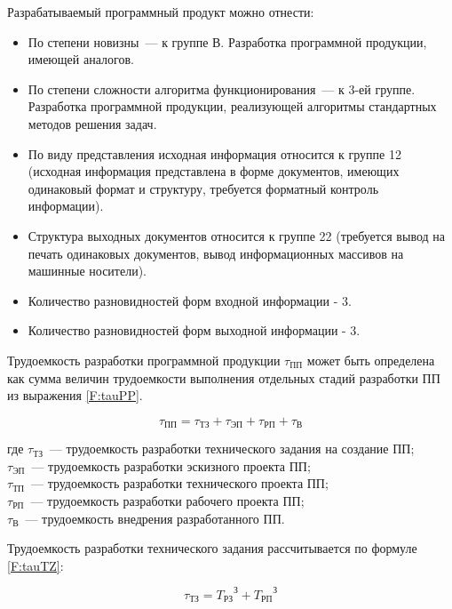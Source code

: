 Разрабатываемый программный продукт можно отнести:
\begin{itemize}
\item По степени новизны~--- к группе В. Разработка программной продукции, имеющей аналогов.
\item По степени сложности алгоритма функционирования~--– к 3-ей группе. Разработка программной продукции, реализующей алгоритмы стандартных методов решения задач.
\item По виду представления исходная информация относится к группе 12 (исходная информация представлена в форме документов, имеющих одинаковый формат и структуру, требуется форматный контроль информации).
\item Структура выходных документов относится к группе 22 (требуется вывод на печать одинаковых документов, вывод информационных массивов на машинные носители).
\item Количество разновидностей форм входной информации - 3.
\item Количество разновидностей форм выходной информации - 3.
\end{itemize}

Трудоемкость разработки программной продукции $\tau_{\text{ПП}}$ может быть определена как сумма величин трудоемкости выполнения отдельных стадий разработки ПП из выражения \ref{F:tauPP}.

\begin{equation}
\tau_{\text{ПП}} = \tau_{\text{ТЗ}} + \tau_{\text{ЭП}} + \tau_{\text{РП}} + \tau_{\text{В}}
\label{F:tauPP}
\end{equation}

где $\tau_{\text{ТЗ}}$~--- трудоемкость разработки технического задания на создание ПП; \\ $\tau_{\text{ЭП}}$~--- трудоемкость разработки эскизного проекта ПП; \\ $\tau_{\text{ТП}}$~--– трудоемкость разработки технического проекта ПП; \\ $\tau_{\text{РП}}$~--– трудоемкость разработки рабочего проекта ПП; \\ $\tau_{\text{В}}$~--- трудоемкость внедрения разработанного ПП.

Трудоемкость разработки технического задания рассчитывается по формуле \ref{F:tauTZ}:

\begin{equation}
\tau_{\text{ТЗ}} = {T_{\text{РЗ}}}^\text{З} + {T_{\text{РП}}}^\text{З}
\label{F:tauTZ}
\end{equation}

